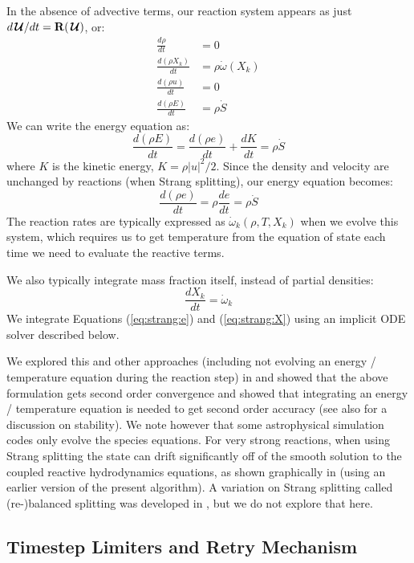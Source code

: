 \documentclass[times,preprint]{aastex63}
\newcommand{\omegadot}{\dot{\omega}}
\newcommand{\Sdot}{\dot{S}}
\newcommand{\odt}[1]{{\frac{{d#1}}{dt}}}
\newcommand{\Uc}{{\,\bm{\mathcal{U}}}}
\newcommand{\Rb}{{\bf R}}
\newcommand{\MarginPar}[1]{\marginpar{\vskip-\baselineskip\raggedright\tiny\sffamily\hrule\smallskip{\color{red}#1}\par\smallskip\hrule}}
\begin{document}
In the absence of advective terms, our reaction system appears as just
$d\Uc/dt = \Rb(\Uc)$, or:
\begin{align}
\odt{\rho} & = 0 \\
\odt{(\rho X_k)} &= \rho \omegadot(X_k) \\
\odt{(\rho u)} &= 0 \\
\odt{(\rho E)} &= \rho \Sdot
\end{align}
We can write the energy equation as:
\begin{equation}
\odt{(\rho E)} = \odt{(\rho e)} + \odt{K} = \rho \Sdot
\end{equation}
where $K$ is the kinetic energy, $K = \rho |u|^2/2$.  Since the density and velocity
are unchanged by reactions (when Strang splitting), our energy equation becomes:
\begin{equation}
\label{eq:strang:e}
\odt{(\rho e)} = \rho \odt{e} = \rho \Sdot
\end{equation}
The reaction rates are typically expressed as $\omegadot_k(\rho, T, X_k)$
when we evolve this system, which requires us to get temperature from
the equation of state each
time we need to evaluate the reactive terms.  

We also typically integrate mass fraction itself, instead of partial
densities:
\begin{equation}
\label{eq:strang:X}
\odt{X_k} = \omegadot_k
\end{equation}
We integrate Equations (\ref{eq:strang:e}) and (\ref{eq:strang:X})
using an implicit ODE solver described below.

We explored this and other approaches (including not evolving an
energy / temperature equation during the reaction step) in
\citet{strang_rnaas} and showed that the above formulation gets second
order convergence and showed that integrating an energy / temperature
equation is needed to get second order accuracy (see also
\citealt{muller:1986} for a discussion on stability).  We note however
that some astrophysical simulation codes only evolve the species
equations.  For very strong reactions, when using Strang splitting the
state can drift significantly off of the smooth solution to the
coupled reactive hydrodynamics equations, as shown graphically in
\citet{astronum:2018} (using an earlier version of the present
algorithm).  A variation on Strang splitting called (re-)balanced
splitting was developed in \citet{speth:2013}, but we do not explore
that here. \MarginPar{keep this sentence?}


\subsection{Timestep Limiters and Retry Mechanism}
\end{document}

